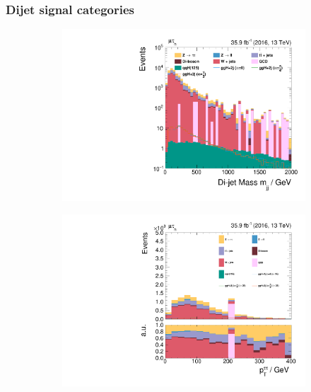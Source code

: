 \subsubsection{Dijet signal categories}%

\begin{figure}[h!]
    \centering
    \begin{subfigure}{.45\textwidth}
        \centering
        \includegraphics[width=\textwidth]{Figures/eventselection/Categorization/mt/mjj.pdf}
    \end{subfigure}%
    \begin{subfigure}{.45\textwidth}
        \centering
        \includegraphics[width=\textwidth]{Figures/eventselection/Categorization/mt/H_pt.pdf}
    \end{subfigure} \\ %

\end{figure}
